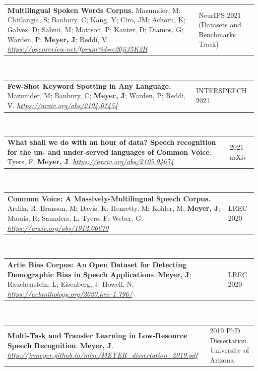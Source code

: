 \documentclass{cv} %
\begin{document}
\begin{tabular}{@{}p{}p{}@{}}
{\bf Multilingual Spoken Words Corpus.}
{Mazumder, M; Chitlangia, S; Banbury, C; Kang, Y; Ciro, JM; Achorn, K; Galvez, D; Sabini, M; Mattson, P; Kanter, D; Diamos, G; Warden, P; \textbf{Meyer, J}; Reddi, V.}
\emph{\url{https://openreview.net/forum?id=c20jiJ5K2H}}
&
{NeurIPS 2021 (Datasets and Benchmarks Track)}
\end{tabular}
\\

\begin{tabular}{@{}p{}p{}@{}}
  {\bf Few-Shot Keyword Spotting in Any Language.}
  {Mazumder, M; Banbury, C; \textbf{Meyer, J}; Warden, P; Reddi, V.}
  \emph{\url{https://arxiv.org/abs/2104.01454}}
  &
  {INTERSPEECH 2021}
\end{tabular}
\\

\begin{tabular}{@{}p{}p{}@{}}
  {\bf What shall we do with an hour of data? Speech recognition for the un- and under-served languages of Common Voice}.
  {Tyers, F; \textbf{Meyer, J}}.
  \emph{\url{https://arxiv.org/abs/2105.04674}}
  &
  {2021 arXiv}
\end{tabular}
\\
       
\begin{tabular}{@{}p{}p{}@{}}
  {\bf Common Voice: A Massively-Multilingual Speech Corpus.}
  {Ardila, R; Branson, M; Davis, K; Henretty, M; Kohler, M; \textbf{Meyer, J}; Morais, R; Saunders, L; Tyers, F; Weber, G}.
  \emph{\url{https://arxiv.org/abs/1912.06670}}
  &
  {LREC 2020}
\end{tabular}
\\

\begin{tabular}{@{}p{}p{}@{}}
{\bf Artie Bias Corpus: An Open Dataset for Detecting Demographic Bias in Speech Applications}.
{\textbf{Meyer, J}; Rauchenstein, L; Eisenberg, J; Howell, N}.
\emph{\url{https://aclanthology.org/2020.lrec-1.796/}}
&
{LREC 2020}
\end{tabular}
\\
       
\begin{tabular}{@{}p{}p{}@{}}
{\bf Multi-Task and Transfer Learning in Low-Resource Speech Recognition}.
{\textbf{Meyer, J}}.
\emph{\url{http://jrmeyer.github.io/misc/MEYER_dissertation_2019.pdf}}
&
     {2019 PhD Dissertation. University of Arizona}.
\end{tabular}
\\
\end{document}
